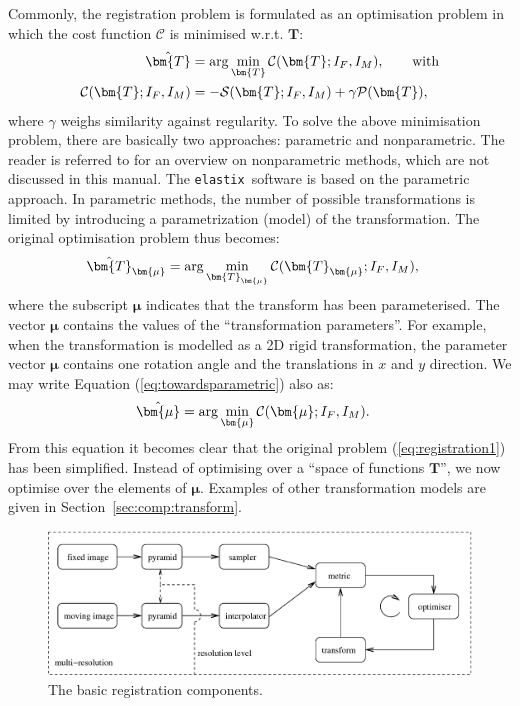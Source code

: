 \documentclass[]{report}
\newcommand{\elastix}{\texttt{elastix}}
\newcommand{\vmu}{\bm{\mu}}
\newcommand{\vT}{\bm{T}}
\newcommand{\vTm}{\bm{T}_{\vmu}}
\newcommand{\CC}{\mathcal{C}}
\newcommand{\Sim}{\mathcal{S}}
\newcommand{\Pen}{\mathcal{P}}
\begin{document}
Commonly, the registration problem is formulated as an optimisation
problem in which the cost function $\mathcal{C}$ is minimised w.r.t.
$\vT$:
\begin{align}
\hat \vT &= \arg \min_{\vT} \CC (\vT; I_F,I_M), \qquad \text{with} \label{eq:registration1}\\
\CC(\vT; I_F,I_M) &= -\Sim(\vT; I_F,I_M) + \gamma
\Pen(\vT),\label{eq:registration2}
\end{align}
where $\gamma$ weighs similarity against regularity. To solve the above
minimisation problem, there are basically two approaches: parametric and
nonparametric. The reader is referred to \cite{Fis04:Unified} for an overview
on nonparametric methods, which are not discussed in this manual. The \elastix\
software is based on the parametric approach. In parametric methods, the number
of possible transformations is limited by introducing a parametrization (model)
of the transformation. The original optimisation problem thus becomes:
\begin{align}
\hat\vTm &= \arg \min_{\vTm}
 \CC(\vTm ; I_F,I_M), \label{eq:towardsparametric}
\end{align}
where the subscript $\vmu$ indicates that the transform has been
parameterised. The vector $\vmu$ contains the values of the
``transformation parameters''. For example, when the
transformation is modelled as a 2D rigid transformation, the
parameter vector $\vmu$ contains one rotation angle and the
translations in $x$ and $y$ direction. We may write Equation
(\ref{eq:towardsparametric}) also as:
\begin{align}
\hat\vmu &= \arg \min_{\vmu} \CC(\vmu; I_F,I_M).
\label{eq:parametric}
\end{align}
From this equation it becomes clear that the original problem
(\ref{eq:registration1}) has been simplified. Instead of optimising
over a ``space of functions $\vT$'', we now optimise over the
elements of $\vmu$. Examples of other transformation models are given
in Section~\ref{sec:comp:transform}.

\begin{figure}[tb]
\centering
\includegraphics[width=\textwidth]{images/registrationcomponents.eps}
\caption{The basic registration components.}
\label{fig:registrationcomponents}
\end{figure}
\end{document}
